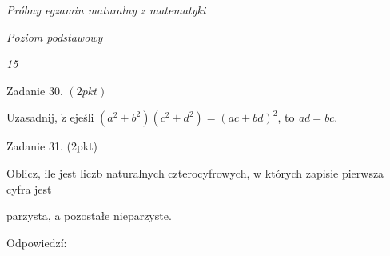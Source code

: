 \documentclass[a4paper,12pt]{article}
\begin{document}
{\it Próbny egzamin maturalny z matematyki}

{\it Poziom podstawowy}

{\it 15}

Zadanie 30. $(2pkt)$

Uzasadnij, $\dot{\mathrm{z}}$ ejeśli $(a^{2}+b^{2})(c^{2}+d^{2})=(ac+bd)^{2}$, to {\it ad}$=bc.$

Zadanie 31. (2pkt)

Oblicz, ile jest liczb naturalnych czterocyfrowych, w których zapisie pierwsza cyfra jest

parzysta, a pozostałe nieparzyste.

Odpowiedzí:
\end{document}
